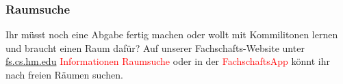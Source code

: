 \subsubsection{Raumsuche}
Ihr müsst noch eine Abgabe fertig machen oder wollt mit Kommilitonen 
lernen und braucht einen Raum dafür? Auf unserer Fachschafts-Website unter \url{fs.cs.hm.edu}  \textcolor{red}{Informationen}  \textcolor{red}{Raumsuche} oder in der 
\textcolor{red}{FachschaftsApp} könnt ihr nach freien Räumen suchen.